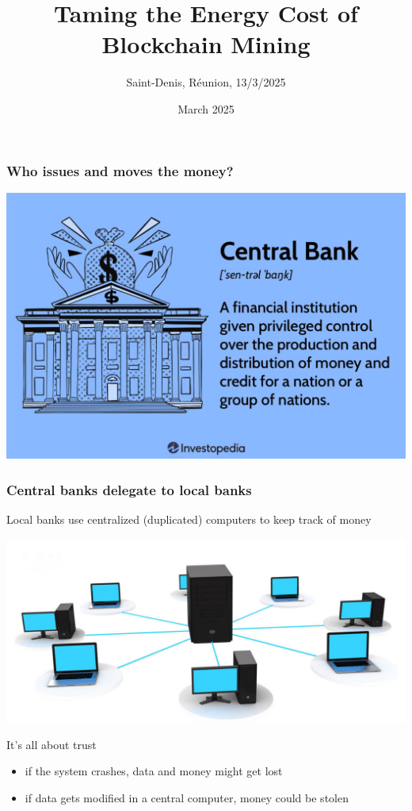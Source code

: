\documentclass[11pt]{beamer}  %
\subtitle{Saint-Denis, R\'eunion, 13/3/2025}
\title{Taming the Energy Cost of Blockchain Mining}
\institute{Universit\`a di Verona, Italy}
\date{March 2025}
\begin{document}
\begin{frame}
  \titlepage
\end{frame}

\begin{frame}\frametitle{Who issues and moves the money?}

  \begin{center}
    \includegraphics[scale=0.22,clip=false]{pictures/central-bank.jpg}
  \end{center}

\end{frame}

\begin{frame}\frametitle{Central banks delegate to local banks}

  Local banks use centralized (duplicated) computers to keep track of money

  \begin{center}
    \includegraphics[scale=0.22,clip=false]{pictures/centralized-network.jpg}
  \end{center}

  \begin{greenbox}{It's all about trust}
    \begin{itemize}
    \item if the system crashes, data and money might get lost
    \item if data gets modified in a central computer, money could be stolen
    \end{itemize}
  \end{greenbox}
  
\end{frame}
\end{document}
